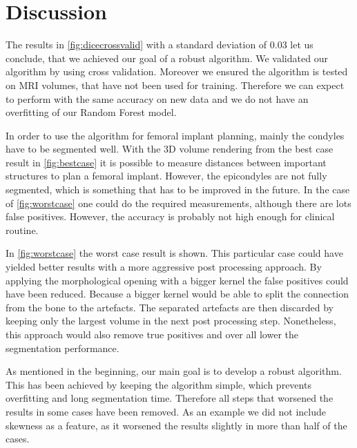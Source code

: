 \section{Discussion}
The results in \autoref{fig:dicecrossvalid} with a standard deviation of 0.03 let us conclude, that we achieved our goal of a robust algorithm. We validated our algorithm by using cross validation. Moreover we ensured the algorithm is tested on MRI volumes, that have not been used for training. Therefore we can expect to perform with the same accuracy on new data and we do not have an overfitting of our Random Forest model.

In order to use the algorithm for femoral implant planning, mainly the condyles have to be segmented well. With the 3D volume rendering from the best case result in \autoref{fig:bestcase} it is possible to measure distances between important structures to plan a femoral implant. However, the epicondyles are not fully segmented, which is something that has to be improved in the future. In the case of \autoref{fig:worstcase} one could do the required measurements, although there are lots false positives. However, the accuracy is probably not high enough for clinical routine.

In \autoref{fig:worstcase} the worst case result is shown. This particular case could have yielded better results with a more aggressive post processing approach. By applying the morphological opening with a bigger kernel the false positives could have been reduced. Because a bigger kernel would be able to split the connection from the bone to the artefacts. The separated artefacts are then discarded by keeping only the largest volume in the next post processing step. Nonetheless, this approach would also remove true positives and over all lower the segmentation performance.

As mentioned in the beginning, our main goal is to develop a robust algorithm. This has been achieved by keeping the algorithm simple, which prevents overfitting and long segmentation time. Therefore all steps that worsened the results in some cases have been removed. As an example we did not include skewness as a feature, as it worsened the results slightly in more than half of the cases.